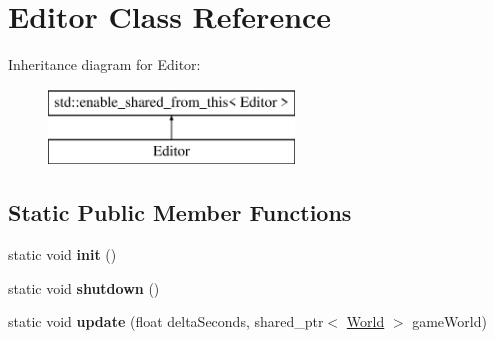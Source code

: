 \hypertarget{class_editor}{}\section{Editor Class Reference}
\label{class_editor}
Inheritance diagram for Editor\+:\begin{figure}[H]
\begin{center}
\leavevmode
\includegraphics[height=2.000000cm]{class_editor}
\end{center}
\end{figure}
\subsection*{Static Public Member Functions}
\begin{DoxyCompactItemize}
\item 
\hypertarget{class_editor_a7cb836a93ceab82c32f159dcfe2b21e4}{}static void {\bfseries init} ()\label{class_editor_a7cb836a93ceab82c32f159dcfe2b21e4}

\item 
\hypertarget{class_editor_a5c88c86f921600ca0d2fc28fcc12bf95}{}static void {\bfseries shutdown} ()\label{class_editor_a5c88c86f921600ca0d2fc28fcc12bf95}

\item 
\hypertarget{class_editor_a4b2a1fd5918cd45445c727db802d9067}{}static void {\bfseries update} (float delta\+Seconds, shared\+\_\+ptr$<$ \hyperlink{class_world}{World} $>$ game\+World)\label{class_editor_a4b2a1fd5918cd45445c727db802d9067}

\end{DoxyCompactItemize}
